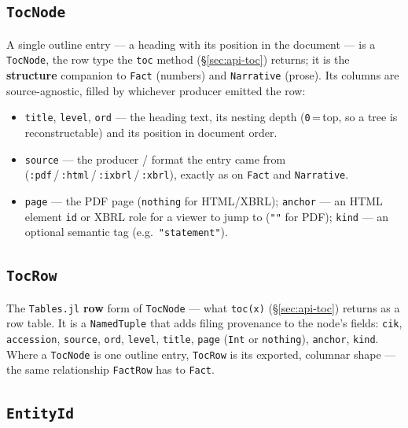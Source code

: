 \documentclass[11pt,a4paper]{report}
\begin{document}
\subsection{\texttt{TocNode}}
\label{sec:api-tocnode}

\noindent A single outline entry --- a heading with its position in the document --- is a \texttt{TocNode}, the
row type the \texttt{toc} method (\S\ref{sec:api-toc}) returns; it is the \textbf{structure} companion to
\texttt{Fact} (numbers) and \texttt{Narrative} (prose). Its columns are source-agnostic, filled by whichever
producer emitted the row:
\begin{itemize}[nosep]
  \item \texttt{title}, \texttt{level}, \texttt{ord} --- the heading text, its nesting depth
    (\texttt{0}\,=\,top, so a tree is reconstructable) and its position in document order.
  \item \texttt{source} --- the producer / format the entry came from
    (\texttt{:pdf}\,/\,\texttt{:html}\,/\,\texttt{:ixbrl}\,/\,\texttt{:xbrl}), exactly as on \texttt{Fact} and
    \texttt{Narrative}.
  \item \texttt{page} --- the PDF page (\texttt{nothing} for HTML/XBRL); \texttt{anchor} --- an HTML element
    \texttt{id} or XBRL role for a viewer to jump to (\texttt{""} for PDF); \texttt{kind} --- an optional
    semantic tag (e.g.\ \texttt{"statement"}).
\end{itemize}

\subsection{\texttt{TocRow}}
\label{sec:api-tocrow}

\noindent The \texttt{Tables.jl} \textbf{row} form of \texttt{TocNode} --- what \texttt{toc(x)}
(\S\ref{sec:api-toc}) returns as a row table. It is a \texttt{NamedTuple} that adds filing provenance to the
node's fields: \texttt{cik}, \texttt{accession}, \texttt{source}, \texttt{ord}, \texttt{level}, \texttt{title},
\texttt{page} (\texttt{Int} or \texttt{nothing}), \texttt{anchor}, \texttt{kind}. Where a \texttt{TocNode} is
one outline entry, \texttt{TocRow} is its exported, columnar shape --- the same relationship \texttt{FactRow}
has to \texttt{Fact}.

\subsection{\texttt{EntityId}}
\label{sec:api-entityid}
\end{document}
